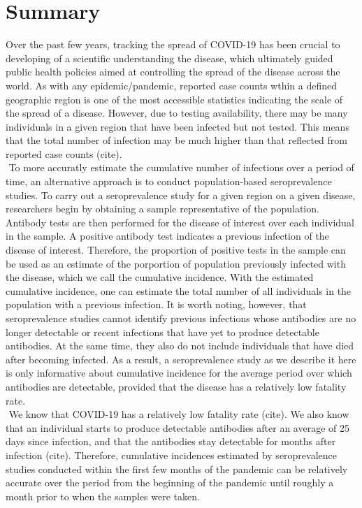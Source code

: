 \section{Summary}
Over the past few years, tracking the spread of COVID-19 has been crucial to developing of a scientific understanding the disease, which ultimately guided public health policies aimed at controlling the spread of the disease across the world. As with any epidemic/pandemic, reported case counts wthin a defined geographic region is one of the most accessible statistics indicating the scale of the spread of a disease. However, due to testing availability, there may be many individuals in a given region that have been infected but not tested. This means that the total number of infection may be much higher than that reflected from reported case counts (cite).\\
\newline$ $
To more accuratly estimate the cumulative number of infections over a period of time, an alternative approach is to conduct population-based seroprevalence studies. To carry out a seroprevalence study for a given region on a given disease, researchers begin by obtaining a sample representative of the population. Antibody tests are then performed for the disease of interest over each individual in the sample. A positive antibody test indicates a previous infection of the disease of interest. Therefore, the proportion of positive tests in the sample can be used as an estimate of the porportion of population previously infected with the disease, which we call the cumulative incidence. With the estimated cumulative incidence, one can estimate the total number of all individuals in the population with a previous infection. It is worth noting, however, that seroprevalence studies cannot identify previous infections whose antibodies are no longer detectable or recent infections that have yet to produce detectable antibodies. At the same time, they also do not include individuals that have died after becoming infected. As a result, a seroprevalence study as we describe it here is only informative about cumulative incidence for the average period over which antibodies are detectable, provided that the disease has a relatively low fatality rate.\\
\newline$ $
We know that COVID-19 has a relatively low fatality rate (cite). We also know that an individual starts to produce detectable antibodies after an average of 25 days since infection, and that the antibodies stay detectable for months after infection (cite). Therefore, cumulative incidences estimated by seroprevalence studies conducted within the first few months of the pandemic can be relatively accurate over the period from the beginning of the pandemic until roughly a month prior to when the samples were taken.\\
\newline$ $
